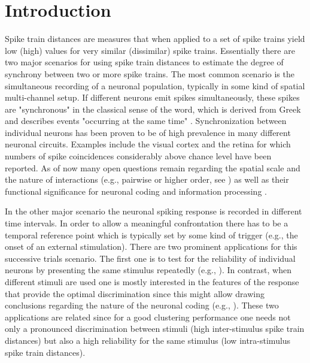 \documentclass[10pt,twocolumn]{elsart5p}
\begin{document}
%
%
%
%
\section{\label{s:Intro} Introduction}

Spike train distances are measures that when applied to a set of spike trains yield low (high) values for very similar (dissimilar) spike trains. Essentially there are two major scenarios for using spike train distances to estimate the degree of synchrony between two or more spike trains. The most common scenario is the simultaneous recording of a neuronal population, typically in some kind of spatial multi-channel setup. If different neurons emit spikes simultaneously, these spikes are "synchronous" in the classical sense of the word, which is derived from Greek and describes events "occurring at the same time" \citep{Pikovsky01}. Synchronization between individual neurons has been proven to be of high prevalence in many different neuronal circuits. Examples include the visual cortex \citep{Tiesinga08} and the retina \citep{Shlens08} for which numbers of spike coincidences considerably above chance level have been reported. As of now many open questions remain regarding the spatial scale and the nature of interactions (e.g., pairwise or higher order, see \citep{Nirenberg07}) as well as their functional significance for neuronal coding and information processing \citep{Kumar10}.

In the other major scenario the neuronal spiking response is recorded in different time intervals. In order to allow a meaningful confrontation there has to be a temporal reference point which is typically set by some kind of trigger (e.g., the onset of an external stimulation). There are two prominent applications for this successive trials scenario. The first one is to test for the reliability of individual neurons by presenting the same stimulus repeatedly (e.g., \citet{Mainen95}). In contrast, when different stimuli are used one is mostly interested in the features of the response that provide the optimal discrimination since this might allow drawing conclusions regarding the nature of the neuronal coding (e.g., \citet{Victor05}). These two applications are related since for a good clustering performance one needs not only a pronounced discrimination between stimuli (high inter-stimulus spike train distances) but also a high reliability for the same stimulus (low intra-stimulus spike train distances).
\end{document}
